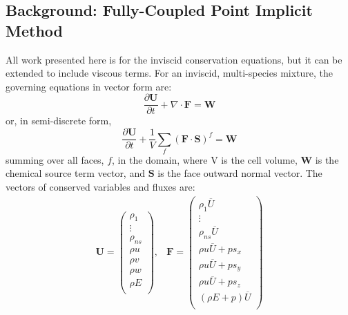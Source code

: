 \subsection{Background: Fully-Coupled Point Implicit Method}

All work presented here is for the inviscid conservation equations, but it can be
extended to include viscous terms.  For an inviscid, multi-species mixture, the
governing equations in vector form are:
\begin{equation}
	\label{inv_flux_vec}
	\frac{\partial \mathbf{U}}{\partial t}
	+ \nabla\cdot \mathbf{F} = \mathbf{W}
\end{equation}
 or, in semi-discrete form,
\begin{equation}
	\label{inv_flux_fv}
	\frac{\partial \mathbf{U}}{\partial t}
	 + \frac{1}{V}\sum\limits_{f}(\mathbf{F}\cdot\mathbf{S})^f = \mathbf{W}
 \end{equation}
summing over all faces, $f$, in the domain, where V is the cell volume, 
$\mathbf{W}$ is the chemical source term vector, and $\mathbf{S}$ is the face
outward normal vector.  The vectors of conserved variables and fluxes are:
\begin{equation}
	\begin{matrix}
	\mathbf{U}=\begin{pmatrix}
   		\rho_1\\
		\vdots \\
		\rho_{ns} \\
		\rho u \\
		\rho v \\
		\rho w \\
		\rho E \\
	\end{pmatrix},      &
 	\mathbf{F} = \begin{pmatrix}
		\rho_1  \overline{U} \\
		\vdots \\
		\rho_{ns} \overline{U} \\
		\rho u \overline{U} + p s_x\\
		\rho u \overline{U} + p s_y\\
		\rho u \overline{U} + p s_z\\
		(\rho E + p) \overline{U} \\
	\end{pmatrix}
	\end{matrix}
 \end{equation}
